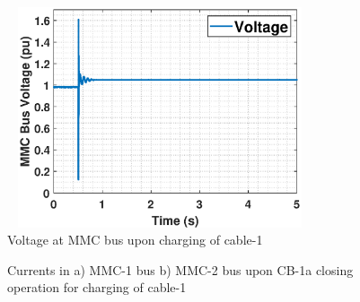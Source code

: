 \begin{figure}[H]
\centering
    \includegraphics[height = 6.5cm,width = 9cm]{Diagrams/Chapter_5/VACP_MMC_bus_Cab1charg.eps}
    \caption{Voltage at MMC bus upon charging of cable-1}
    \label{VACP_MMC_bus_Cab1charg}
\end{figure}

\begin{figure}[H]
\hspace*{-1.2cm}

\hspace*{-1.2cm}

\caption{Currents in a) MMC-1 bus b) MMC-2 bus upon CB-1a closing operation for charging of cable-1}
\label{fig:IABC_MMC_1_2_CB_Cab1charg}
\end{figure}

